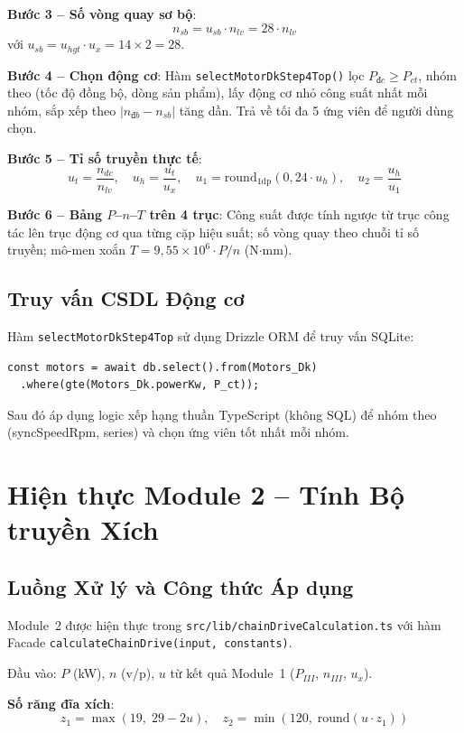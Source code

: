 \textbf{Bước 3 -- Số vòng quay sơ bộ}:
\[
  n_{sb} = u_{sb} \cdot n_{lv} = 28 \cdot n_{lv}
\]
với $u_{sb} = u_{hgt} \cdot u_x = 14 \times 2 = 28$.

\textbf{Bước 4 -- Chọn động cơ}: Hàm \texttt{selectMotorDkStep4Top()} lọc
$P_{đc} \geq P_{ct}$, nhóm theo (tốc độ đồng bộ, dòng sản phẩm),
lấy động cơ nhỏ công suất nhất mỗi nhóm, sắp xếp theo $|n_{đb} - n_{sb}|$ tăng dần.
Trả về tối đa 5 ứng viên để người dùng chọn.

\textbf{Bước 5 -- Tỉ số truyền thực tế}:
\[
  u_t = \frac{n_{dc}}{n_{lv}}, \quad
  u_h = \frac{u_t}{u_x}, \quad
  u_1 = \text{round}_{1\text{dp}}(0{,}24 \cdot u_h), \quad
  u_2 = \frac{u_h}{u_1}
\]

\textbf{Bước 6 -- Bảng $P$--$n$--$T$ trên 4 trục}:
Công suất được tính ngược từ trục công tác lên trục động cơ qua từng cặp hiệu suất;
số vòng quay theo chuỗi tỉ số truyền;
mô-men xoắn $T = 9{,}55 \times 10^6 \cdot P/n$ (N$\cdot$mm).

\subsection{Truy vấn CSDL Động cơ}

Hàm \texttt{selectMotorDkStep4Top} sử dụng Drizzle ORM để truy vấn SQLite:

\begin{verbatim}
const motors = await db.select().from(Motors_Dk)
  .where(gte(Motors_Dk.powerKw, P_ct));
\end{verbatim}

Sau đó áp dụng logic xếp hạng thuần TypeScript (không SQL) để nhóm theo
(syncSpeedRpm, series) và chọn ứng viên tốt nhất mỗi nhóm.

\section{Hiện thực Module 2 -- Tính Bộ truyền Xích}
\label{sec:impl-m2}

\subsection{Luồng Xử lý và Công thức Áp dụng}

Module~2 được hiện thực trong \texttt{src/lib/chainDriveCalculation.ts}
với hàm Facade \texttt{calculateChainDrive(input, constants)}.

Đầu vào: $P$ (kW), $n$ (v/p), $u$ từ kết quả Module~1 ($P_{III}$, $n_{III}$, $u_x$).

\textbf{Số răng đĩa xích}:
\[
  z_1 = \max(19,\; 29 - 2u), \quad z_2 = \min(120,\; \text{round}(u \cdot z_1))
\]

